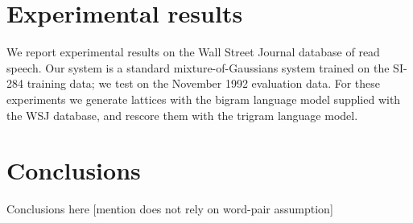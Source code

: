 \documentclass{article}
\begin{document}
\section{Experimental results}
\label{sec:exp}

We report experimental results on the Wall Street Journal database of
read speech.  
Our system is a standard mixture-of-Gaussians system trained on the SI-284
training data; we test on the November 1992 evaluation data.  
For these experiments we generate lattices with the bigram language model
supplied with the WSJ database, and rescore them with the trigram language model.









\section{Conclusions}
\label{sec:conc}

Conclusions here [mention does not rely on word-pair assumption]



\end{document}
